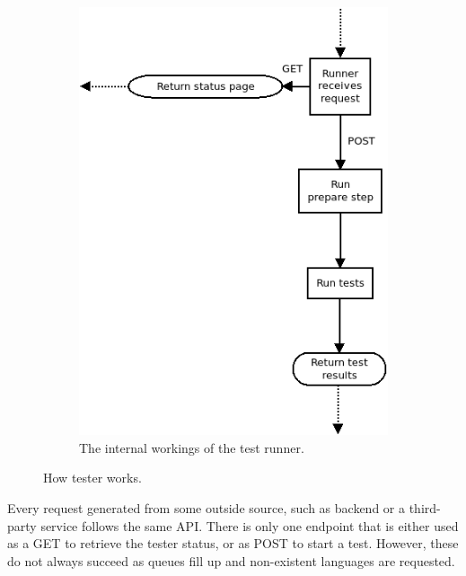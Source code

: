 \begin{figure}
\begin{subfigure}{.6\linewidth}
    \includegraphics[width=.7\linewidth]{img/runner_usage.png}
    \caption{The internal workings of the test runner.}
    \end{subfigure}

    \caption{How tester works.}\label{fig:tester_internals}
\end{figure}
Every request generated from some outside source, such as backend or a third-party service follows the same API. There is only one endpoint that is either used as a GET to retrieve the tester status, or as POST to start a test. However, these do not always succeed as queues fill up and non-existent languages are requested. 
